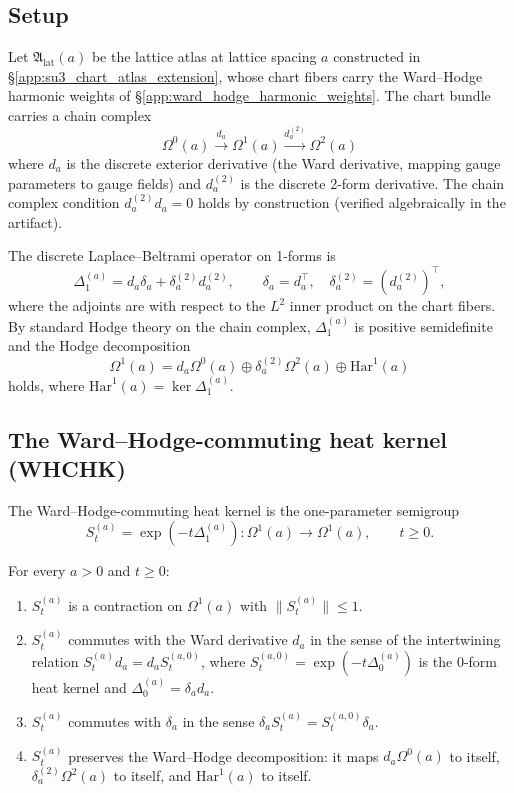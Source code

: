\subsection{Setup}

Let $\mathfrak{A}_{\mathrm{lat}}(a)$ be the lattice atlas at lattice
spacing $a$ constructed in \S\ref{app:su3_chart_atlas_extension},
whose chart fibers carry the Ward--Hodge harmonic weights of
\S\ref{app:ward_hodge_harmonic_weights}. The chart bundle carries a
chain complex
\[
\Omega^{0}(a) \xrightarrow{d_{a}} \Omega^{1}(a)
\xrightarrow{d_{a}^{(2)}} \Omega^{2}(a)
\]
where $d_{a}$ is the discrete exterior derivative (the Ward
derivative, mapping gauge parameters to gauge fields) and
$d_{a}^{(2)}$ is the discrete 2-form derivative. The chain complex
condition $d_{a}^{(2)} d_{a} = 0$ holds by construction (verified
algebraically in the artifact).

The discrete Laplace--Beltrami operator on 1-forms is
\[
\Delta_{1}^{(a)} = d_{a} \delta_{a} + \delta_{a}^{(2)} d_{a}^{(2)},
\qquad \delta_{a} = d_{a}^{\top}, \quad
\delta_{a}^{(2)} = (d_{a}^{(2)})^{\top},
\]
where the adjoints are with respect to the $L^{2}$ inner product on
the chart fibers. By standard Hodge theory on the chain complex,
$\Delta_{1}^{(a)}$ is positive semidefinite and the Hodge
decomposition
\[
\Omega^{1}(a) = d_{a} \Omega^{0}(a) \oplus \delta_{a}^{(2)}
\Omega^{2}(a) \oplus \mathrm{Har}^{1}(a)
\]
holds, where $\mathrm{Har}^{1}(a) = \ker \Delta_{1}^{(a)}$.

\subsection{The Ward--Hodge-commuting heat kernel (WHCHK)}

\begin{definition}
\label{def:whchk}
The Ward--Hodge-commuting heat kernel is the one-parameter semigroup
\[
S_{t}^{(a)} = \exp(-t \Delta_{1}^{(a)}) : \Omega^{1}(a) \to
\Omega^{1}(a), \qquad t \ge 0.
\]
\end{definition}

\begin{theorem}
\label{thm:whchk}
For every $a > 0$ and $t \ge 0$:
\begin{enumerate}
\item $S_{t}^{(a)}$ is a contraction on $\Omega^{1}(a)$ with
  $\|S_{t}^{(a)}\| \le 1$.
\item $S_{t}^{(a)}$ commutes with the Ward derivative $d_{a}$ in the
  sense of the intertwining relation
  $S_{t}^{(a)} d_{a} = d_{a} S_{t}^{(a,0)}$, where
  $S_{t}^{(a,0)} = \exp(-t \Delta_{0}^{(a)})$ is the 0-form heat kernel
  and $\Delta_{0}^{(a)} = \delta_{a} d_{a}$.
\item $S_{t}^{(a)}$ commutes with $\delta_{a}$ in the sense
  $\delta_{a} S_{t}^{(a)} = S_{t}^{(a,0)} \delta_{a}$.
\item $S_{t}^{(a)}$ preserves the Ward--Hodge decomposition: it maps
  $d_{a} \Omega^{0}(a)$ to itself, $\delta_{a}^{(2)} \Omega^{2}(a)$
  to itself, and $\mathrm{Har}^{1}(a)$ to itself.
\end{enumerate}
\end{theorem}

